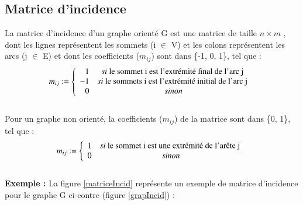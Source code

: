 			\subsection{Matrice d'incidence}
			La matrice d'incidence d'un graphe orienté  G est une matrice de taille $n \times m$ , dont les lignes représentent les sommets (i $\in$ V) et les colons représentent les arcs (j $\in$ E) et dont les coefficients (${m}_{ij}$) sont dans \{-1, 0, 1\}, tel que \citep{hennecart2012elements} \citep{mathieu} :
			\[{m}_{ij} :=
			\left\{
			\begin{array}{r c l}
			1 & si $ le sommet i est l'extrémité final de 					l'arc j $ \\
			
			-1 & si $ le sommets i est l'extrémité initial de 				l'arc j $ \\
			0 & sinon \\
			\end{array}
			\right.
			\]
			\\
Pour un graphe non orienté, la coefficients (${m}_{ij}$) de la matrice sont dans \{0, 1\}, tel que \citep{hennecart2012elements} :
			\[{m}_{ij} :=
			\left\{
			\begin{array}{r c l}
			1 & si $ le sommet i est une extrémité					de l'arête j $ \\
			0 & sinon \\
			\end{array}
			\right.
			\]
			\\
\textbf{Exemple :} La figure \ref{matriceIncid} représente 					un exemple de matrice d'incidence pour le graphe G ci-contre 			(figure \ref{grapIncid}) :
			
